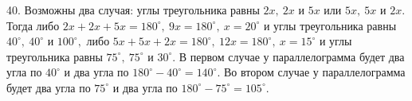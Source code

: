 40. Возможны два случая: углы треугольника равны $2x,\ 2x$ и $5x$ или $5x,\ 5x$ и $2x.$ Тогда либо $2x+2x+5x=180^\circ,\ 9x=180^\circ,\ x=20^\circ$ и углы треугольника равны $40^\circ,\ 40^\circ$  и $100^\circ,$ либо $5x+5x+2x=180^\circ,\ 12x=180^\circ,\ x=15^\circ$ и углы треугольника равны $75^\circ,\ 75^\circ$ и $30^\circ.$ В первом случае у параллелограмма будет два угла по $40^\circ$ и два угла по $180^\circ-40^\circ=140^\circ.$ Во втором случае у параллелограмма будет два угла по $75^\circ$ и два угла по $180^\circ-75^\circ=105^\circ.$\newpage\noindent
